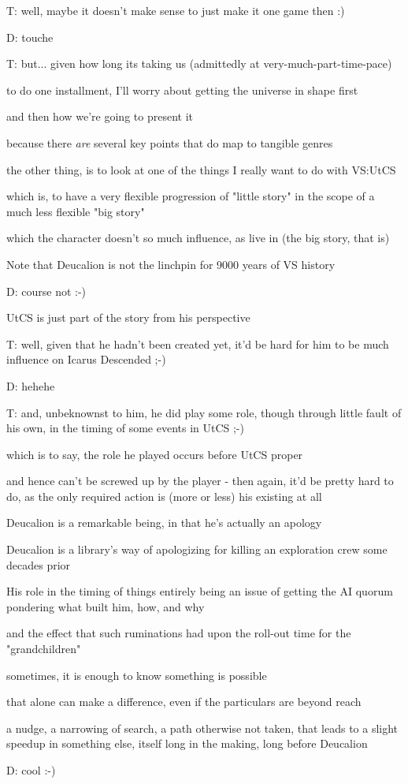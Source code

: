 {T: well, maybe it doesn't make sense to just make it one game then :)

D: touche

T: but... given how long its taking us (admittedly at very-much-part-time-pace)

to do one installment, I'll worry about getting the universe in shape first

and then how we're going to present it

because there {\em are} several key points that do map to tangible genres

the other thing, is to look at one of the things I really want to do with VS:UtCS

which is, to have a very flexible progression of "little story" in the scope of a much less flexible "big story"

which the character doesn't so much influence, as live in (the big story, that is)

Note that Deucalion is not the linchpin for 9000 years of VS history

D: course not :-)

UtCS is just part of the story from his perspective

T: well, given that he hadn't been created yet, it'd be hard for him to be much influence on Icarus Descended ;-)

D: hehehe

T: and, unbeknownst to him, he did play some role, though through little fault of his own, in the timing of some events in UtCS ;-)

which is to say, the role he played occurs before UtCS proper

and hence can't be screwed up by the player - then again, it'd be pretty hard to do, as the only required action is (more or less) his existing at all 

Deucalion is a remarkable being, in that he's actually an apology

Deucalion is a library's way of apologizing for killing an exploration crew some decades prior

His role in the timing of things entirely being an issue of getting the AI quorum pondering what built him, how, and why

and the effect that such ruminations had upon the roll-out time for the "grandchildren"

sometimes, it is enough to know something is possible

that alone can make a difference, even if the particulars are beyond reach

a nudge, a narrowing of search, a path otherwise not taken, that leads to a slight speedup in something else, itself long in the making, long before Deucalion

D: cool :-)
}


